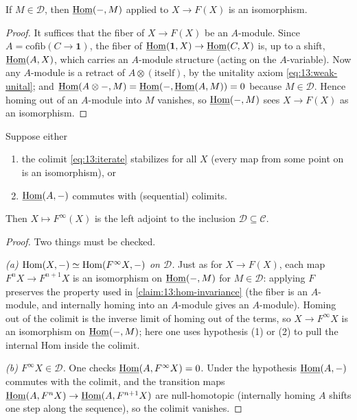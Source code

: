 \begin{claim}
\label{claim:13:hom-invariance}
If $M\in\mathcal D$, then $\underline{\operatorname{Hom}}(-,M)$ applied to $X\to F(X)$ is an isomorphism.
\end{claim}

\begin{proof}
It suffices that the fiber of $X\to F(X)$ be an $A$-module. Since
$A=\mathrm{cofib}(C\to\mathbf 1)$, the fiber of
$\underline{\operatorname{Hom}}(\mathbf 1,X)\to\underline{\operatorname{Hom}}(C,X)$ is, up to a shift, $\underline{\operatorname{Hom}}(A,X)$, which carries
an $A$-module structure (acting on the $A$-variable). Now any $A$-module is a
retract of $A\otimes(\text{itself})$, by the unitality axiom
\eqref{eq:13:weak-unital}; and $\underline{\operatorname{Hom}}(A\otimes-,M)=\underline{\operatorname{Hom}}(-,\underline{\operatorname{Hom}}(A,M))=0$ because
$M\in\mathcal D$. Hence homing out of an $A$-module into $M$ vanishes, so
$\underline{\operatorname{Hom}}(-,M)$ sees $X\to F(X)$ as an isomorphism.
\end{proof}

\begin{proposition}
\label{prop:13:left-adjoint}
Suppose either
\begin{enumerate}
\item the colimit \eqref{eq:13:iterate} stabilizes for all $X$ (every map from
some point on is an isomorphism), or
\item $\underline{\operatorname{Hom}}(A,-)$ commutes with (sequential) colimits.
\end{enumerate}
Then $X\mapsto F^\infty(X)$ is the left adjoint to the inclusion
$\mathcal D\subseteq\mathcal C$.
\end{proposition}

\begin{proof}
Two things must be checked.

\emph{(a) $\operatorname{Hom}(X,-)\simeq\operatorname{Hom}(F^\infty X,-)$ on $\mathcal D$.} Just as for
$X\to F(X)$, each map $F^n X\to F^{n+1}X$ is an isomorphism on $\underline{\operatorname{Hom}}(-,M)$ for
$M\in\mathcal D$: applying $F$ preserves the property used in
\cref{claim:13:hom-invariance} (the fiber is an $A$-module, and internally homing
into an $A$-module gives an $A$-module). Homing out of the colimit is the inverse
limit of homing out of the terms, so $X\to F^\infty X$ is an isomorphism on
$\underline{\operatorname{Hom}}(-,M)$; here one uses hypothesis (1) or (2) to pull the internal Hom inside
the colimit.

\emph{(b) $F^\infty X\in\mathcal D$.} One checks $\underline{\operatorname{Hom}}(A,F^\infty X)=0$. Under
the hypothesis $\underline{\operatorname{Hom}}(A,-)$ commutes with the colimit, and the transition maps
$\underline{\operatorname{Hom}}(A,F^n X)\to\underline{\operatorname{Hom}}(A,F^{n+1}X)$ are null-homotopic (internally homing $A$
shifts one step along the sequence), so the colimit vanishes.
\end{proof}

